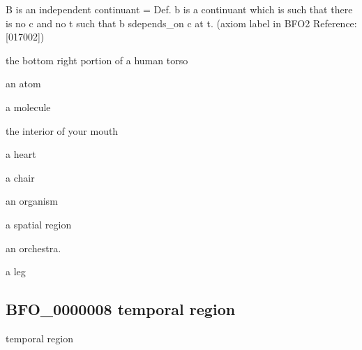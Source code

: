 \documentclass[letterpaper,10pt,english]{sphinxmanual}
\begin{document}
\begin{sphinxShadowBox}

\sphinxAtStartPar
B is an independent continuant = Def. b is a continuant which is such that there is no c and no t such that b s\sphinxhyphen{}depends\_on c at t. (axiom label in BFO2 Reference: {[}017\sphinxhyphen{}002{]})
\end{sphinxShadowBox}

\begin{sphinxShadowBox}

\sphinxAtStartPar
the bottom right portion of a human torso

\sphinxAtStartPar
an atom

\sphinxAtStartPar
a molecule

\sphinxAtStartPar
the interior of your mouth

\sphinxAtStartPar
a heart

\sphinxAtStartPar
a chair

\sphinxAtStartPar
an organism

\sphinxAtStartPar
a spatial region

\sphinxAtStartPar
an orchestra.

\sphinxAtStartPar
a leg
\end{sphinxShadowBox}

\begin{sphinxShadowBox}

\sphinxAtStartPar
{}
\end{sphinxShadowBox}
\begin{quote}

\ignorespaces \end{quote}


\subsection{BFO\_0000008 \sphinxhyphen{} temporal region}
\label{\detokenize{doc-BFO_0000008:bfo-0000008-temporal-region}}\label{\detokenize{doc-BFO_0000008:index-0}}\label{\detokenize{doc-BFO_0000008::doc}}
\begin{sphinxShadowBox}

\sphinxAtStartPar
temporal region
\end{sphinxShadowBox}
\end{document}
